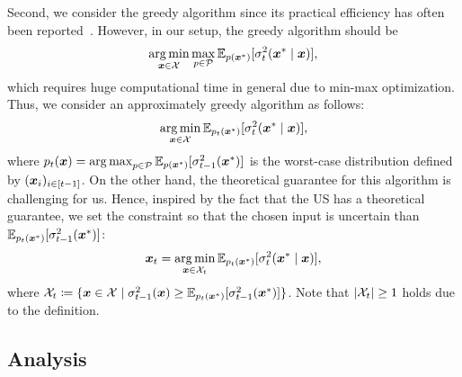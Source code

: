 Second, we consider the greedy algorithm since its practical efficiency has often been reported~\citep[e.g., ][]{bian2017guarantees}.
%
However, in our setup, the greedy algorithm should be
\begin{align*}
    \operatorname*{arg\,min}_{\boldsymbol{x} \in {\cal X}} \max_{p \in {\cal P}} \mathbb{E}_{p(\boldsymbol{x}^{*})}[\sigma_{t}^2 (\boldsymbol{x}^{*} \mid \boldsymbol{x})],
\end{align*}
which requires huge computational time in general due to min-max optimization.
%
Thus, we consider an approximately greedy algorithm as follows:
\begin{align*}
    \operatorname*{arg\,min}_{\boldsymbol{x} \in {\cal X}} \mathbb{E}_{p_t(\boldsymbol{x}^{*})}[\sigma_{t}^2 (\boldsymbol{x}^{*} \mid \boldsymbol{x})],
\end{align*}
where $p_t(\boldsymbol{x}) = \operatorname*{arg\,max}_{p \in {\cal P}} \mathbb{E}_{p(\boldsymbol{x}^{*})}[\sigma_{t-1}^2 (\boldsymbol{x}^{*})]$ is the worst-case distribution defined by $(\boldsymbol{x}_i)_{i \in [t-1]}$.
%
On the other hand, the theoretical guarantee for this algorithm is challenging for us.
%
Hence, inspired by the fact that the US has a theoretical guarantee, we set the constraint so that the chosen input is uncertain than $\mathbb{E}_{p_t(\boldsymbol{x}^{*})}[\sigma_{t-1}^2 (\boldsymbol{x}^{*})]$:
\begin{align}
    \boldsymbol{x}_t = \operatorname*{arg\,min}_{\boldsymbol{x} \in {\cal X}_t} \mathbb{E}_{p_t(\boldsymbol{x}^{*})}[\sigma_t^2 (\boldsymbol{x}^{*} \mid \boldsymbol{x})],
    \label{eq:greedy}
\end{align}
where ${\cal X}_t \coloneqq \{ \boldsymbol{x} \in {\cal X} \mid \sigma^2_{t-1}(\boldsymbol{x}) \geq \mathbb{E}_{p_t(\boldsymbol{x}^{*})}[\sigma_{t-1}^2 (\boldsymbol{x}^{*})] \}$.
%
Note that $|{\cal X}_t| \geq 1$ holds due to the definition.


\subsection{Analysis}
\label{sec:analysis}


